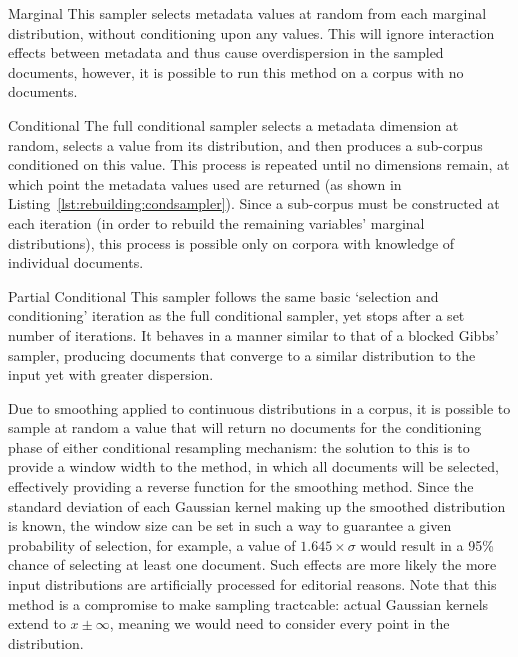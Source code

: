 \begin{itemizeTitle}
    \item[Marginal] This sampler selects metadata values at random from each marginal distribution, without conditioning upon any values.  This will ignore interaction effects between metadata and thus cause overdispersion in the sampled documents, however, it is possible to run this method on a corpus with no documents.

    \item[Conditional] The full conditional sampler selects a metadata dimension at random, selects a value from its distribution, and then produces a sub-corpus conditioned on this value.  This process is repeated until no dimensions remain, at which point the metadata values used are returned (as shown in Listing~\ref{lst:rebuilding:condsampler}).  Since a sub-corpus must be constructed at each iteration (in order to rebuild the remaining variables' marginal distributions), this process is possible only on corpora with knowledge of individual documents.
    
    \item[Partial Conditional] This sampler follows the same basic `selection and conditioning' iteration as the full conditional sampler, yet stops after a set number of iterations.  It behaves in a manner similar to that of a blocked Gibbs' sampler, producing documents that converge to a similar distribution to the input yet with greater dispersion.
\end{itemizeTitle}

Due to smoothing applied to continuous distributions in a corpus, it is possible to sample at random a value that will return no documents for the conditioning phase of either conditional resampling mechanism: the solution to this is to provide a window width to the method, in which all documents will be selected, effectively providing a reverse function for the smoothing method.  Since the standard deviation of each Gaussian kernel making up the smoothed distribution is known, the window size can be set in such a way to guarantee a given probability of selection, for example, a value of $1.645 \times \sigma$ would result in a 95\% chance of selecting at least one document.  Such effects are more likely the more input distributions are artificially processed for editorial reasons.  Note that this method is a compromise to make sampling tractcable: actual Gaussian kernels extend to $x \pm \infty$, meaning we would need to consider every point in the distribution.

